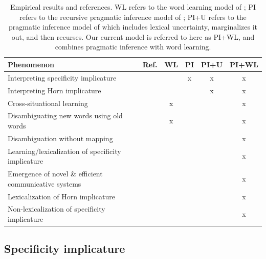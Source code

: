 \documentclass{article} %
\begin{document}
\begin{table}[t]
\label{tab:results}
\begin{center}
\begin{tabular}{lccccc}
\toprule
Phenomenon & Ref. & WL & PI & PI+U & PI+WL \\
\midrule
Interpreting specificity implicature & \cite{grice1975} &  & x &x & x\\
Interpreting Horn implicature & \cite{horn1984} & &  & x& x\\
Cross-situational learning & \cite{smith2008} & x& & & x \\
Disambiguating new words using old words & \cite{markman1988} &x  & & & x \\
Disambiguation without mapping & \cite{horst2008} &  & & & x \\
Learning/lexicalization of specificity implicature & \cite{levinson2000} & & & & x \\
Emergence of novel \& efficient communicative systems & \cite{galantucci2005} & & & & x \\
Lexicalization of Horn implicature & \cite{horn1984} & & & & x \\
Non-lexicalization of specificity implicature & \cite{levinson2000} & & & & x \\
\hline
\end{tabular}
\end{center}
\caption{Empirical results and references. WL refers to the word
  learning model of \cite{frank2009}; PI refers to the recursive
  pragmatic inference model of \cite{frank2012}; PI+U refers to the
  pragmatic inference model of \cite{bergen2012} which includes
  lexical uncertainty, marginalizes it out, and then recurses. Our
  current model is referred to here as PI+WL, and combines pragmatic
  inference with word learning.}
\end{table}



\subsection{Specificity implicature}
\end{document}
